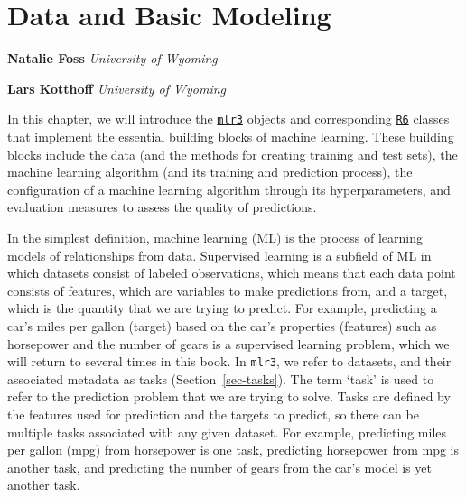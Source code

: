 \hypertarget{sec-basics}{%
\chapter{Data and Basic Modeling}\label{sec-basics}}

\vspace{-15mm}

\textbf{Natalie Foss} \newline  \emph{University of Wyoming}

\textbf{Lars Kotthoff} \newline  \emph{University of Wyoming}
\newline \newline 

In this chapter, we will introduce the
\href{https://mlr3.mlr-org.com}{\texttt{mlr3}}
objects and corresponding
\href{https://cran.r-project.org/package=R6}{\texttt{R6}} classes that
implement the essential building blocks of machine learning. These
building blocks include the data (and the methods for creating training
and test sets), the machine learning algorithm (and its
training and prediction process), the configuration of a machine
learning algorithm through its hyperparameters,
and evaluation measures to assess the quality of predictions.

In the simplest definition, machine learning
(ML) is the process of learning models of relationships from
data.{} Supervised
learning is a subfield of ML in which
datasets consist of labeled observations, which means that each data
point consists of features, which are variables to make
predictions from, and a target, which is the quantity that
we are trying to predict. For example, predicting a car's miles per
gallon (target) based on the car's properties (features) such as
horsepower and the number of gears is a supervised learning problem,
which we will return to several times in this book. In \texttt{mlr3}, we
refer to datasets, and their associated metadata as tasks
(Section~\ref{sec-tasks}). The term `task' is used to refer to the
prediction problem that we are trying to solve. Tasks are defined by the
features used for prediction and the targets to predict, so there can be
multiple tasks associated with any given dataset. For example,
predicting miles per gallon (mpg) from horsepower is one task,
predicting horsepower from mpg is another task, and predicting the
number of gears from the car's model is yet another task.

